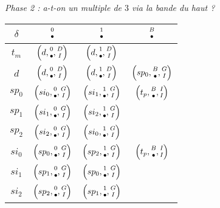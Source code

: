 \begin{center}
	\emph{\small Phase 2 : a-t-on un multiple de $3$ via la bande du haut ?}
	
	\smallskip
	\renewcommand{\arraystretch}{1.25}
	\begin{tabular}{|c||c|c|c|}
		\hline
		$\delta$ 
			& $\twocoord{0}{\bullet}$ 
			& $\twocoord{1}{\bullet}$ 
			& $\twocoord{B}{\bullet}$  \\
		\hline
		\hline
		$t_m$ 
			& $\left( d , \twocoord{0}{\bullet}, \twocoord{D}{I} \right)$ 
			& $\left( d , \twocoord{1}{\bullet}, \twocoord{D}{I} \right)$
			&  \\
		\hline
		$d$ 
			& $\left( d   , \twocoord{0}{\bullet}, \twocoord{D}{I} \right)$ 
			& $\left( d   , \twocoord{1}{\bullet}, \twocoord{D}{I} \right)$
			& $\left( sp_0, \twocoord{B}{\bullet}, \twocoord{G}{I} \right)$ \\
		\hline
		\hline
		$sp_0$ 
			& $\left( si_0 , \twocoord{0}{\bullet}, \twocoord{G}{I} \right)$ 
			& $\left( si_1 , \twocoord{1}{\bullet}, \twocoord{G}{I} \right)$
			& $\left( t_p  , \twocoord{B}{\bullet}, \twocoord{I}{I} \right)$ \\
		\hline
		$sp_1$ 
			& $\left( si_1 , \twocoord{0}{\bullet}, \twocoord{G}{I} \right)$ 
			& $\left( si_2 , \twocoord{1}{\bullet}, \twocoord{G}{I} \right)$
			&                 \\
		\hline
		$sp_2$ 
			& $\left( si_2 , \twocoord{0}{\bullet}, \twocoord{G}{I} \right)$ 
			& $\left( si_0 , \twocoord{1}{\bullet}, \twocoord{G}{I} \right)$
			&                 \\
		\hline
		\hline
		$si_0$ 
			& $\left( sp_0 , \twocoord{0}{\bullet}, \twocoord{G}{I} \right)$ 
			& $\left( sp_2 , \twocoord{1}{\bullet}, \twocoord{G}{I} \right)$
			& $\left( t_p  , \twocoord{B}{\bullet}, \twocoord{I}{I} \right)$ \\
		\hline
		$si_1$ 
			& $\left( sp_1 , \twocoord{0}{\bullet}, \twocoord{G}{I} \right)$ 
			& $\left( sp_0 , \twocoord{1}{\bullet}, \twocoord{G}{I} \right)$
			&                 \\
		\hline
		$si_2$ 
			& $\left( sp_2 , \twocoord{0}{\bullet}, \twocoord{G}{I} \right)$ 
			& $\left( sp_1 , \twocoord{1}{\bullet}, \twocoord{G}{I} \right)$
			&                 \\
		\hline
	\end{tabular}
	\renewcommand{\arraystretch}{1}
\end{center}



\newpage



